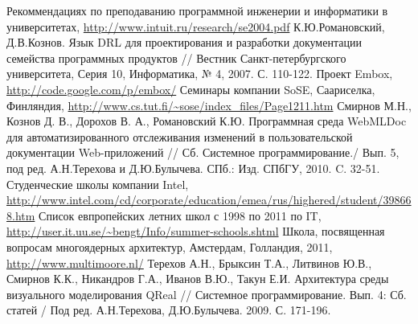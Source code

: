 \documentclass[a5paper]{article}
\begin{document}
\begin{thebibliography}{9001}
   Рекоммендациях по преподаванию программной инженерии и информатики в университетах, \url{http://www.intuit.ru/research/se2004.pdf}
  К.Ю.Романовский, Д.В.Кознов. Язык DRL для проектирования и разработки документации семейства программных продуктов // Вестник Санкт-петербургского университета, Серия 10, Информатика, № 4, 2007. С. 110-122.
   Проект Embox, \url{http://code.google.com/p/embox/}
   Семинары компании SoSE, Саариселка, Финляндия, \url{http://www.cs.tut.fi/~sose/index_files/Page1211.htm}
  Смирнов М.Н., Кознов Д. В., Дорохов В. А., Романовский К.Ю.  Программная среда WebMLDoc для автоматизированного отслеживания изменений в пользовательской документации Web-приложений // Сб. Системное программирование./ Вып. 5, под ред. А.Н.Терехова и Д.Ю.Булычева. СПб.: Изд. СПбГУ, 2010. C. 32-51.
   Студенческие школы компании Intel, \url{http://www.intel.com/cd/corporate/education/emea/rus/highered/student/398668.htm}
   Список  евпропейских летних школ с 1998 по 2011 по IT, \url{http://user.it.uu.se/~bengt/Info/summer-schools.shtml}
   Школа, посвященная вопросам многоядерных архитектур, Амстердам, Голландия, 2011, \url{http://www.multimoore.nl/}
   Терехов А.Н., Брыксин Т.А., Литвинов Ю.В., Смирнов К.К., Никандров  Г.А., Иванов В.Ю., Такун Е.И. Архитектура среды визуального  моделирования QReal // Системное программирование. Вып. 4: Сб. статей  / Под ред. А.Н.Терехова, Д.Ю.Булычева. 2009. С. 171-196.



\end{thebibliography}
\end{document}
